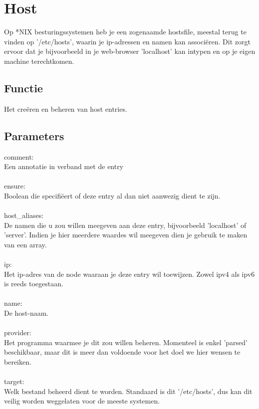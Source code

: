 \section{Host}
Op *NIX besturingssystemen heb je een zogenaamde hostsfile, meestal terug te vinden op '/etc/hosts', waarin je ip-adressen en namen kan associ\"{e}ren. Dit zorgt ervoor dat je bijvoorbeeld in je web-browser 'localhost' kan intypen en op je eigen machine terechtkomen.

\subsection{Functie}
Het cre\"{e}ren en beheren van host entries.

\subsection{Parameters}
comment:\\
Een annotatie in verband met de entry\\\\
%
ensure:\\
Boolean die specifi\"{e}ert of deze entry al dan niet aanwezig dient te zijn.\\\\
%
host\_aliases:\\
De namen die u zou willen meegeven aan deze entry, bijvoorbeeld 'localhost' of 'server'. Indien je hier meerdere waardes wil meegeven dien je gebruik te maken van een array.\\\\
%
ip:\\
Het ip-adres van de node waaraan je deze entry wil toewijzen. Zowel ipv4 als ipv6 is reeds toegestaan.\\\\
%
name:\\
De host-naam.\\\\
%
provider:\\
Het programma waarmee je dit zou willen beheren. Momenteel is enkel 'parsed' beschikbaar, maar dit is meer dan voldoende voor het doel we hier wensen te bereiken.\\\\
%
target:\\
Welk bestand beheerd dient te worden. Standaard is dit '/etc/hosts', dus kan dit veilig worden weggelaten voor de meeste systemen.\\\\
